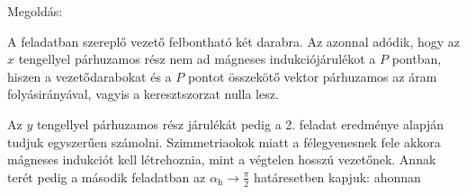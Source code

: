 
\ifdefined\megoldas
  
 Megoldás: 

 A feladatban szereplő vezető felbontható két darabra. Az azonnal adódik, hogy az $x$ tengellyel párhuzamos rész nem ad mágneses indukciójárulékot a $P$ pontban, hiszen a vezetődarabokat és a $P$ pontot összekötő vektor párhuzamos az áram folyásirányával, vagyis a keresztszorzat nulla lesz. 

 Az $y$ tengellyel párhuzamos rész járulékát pedig a 2. feladat eredménye alapján tudjuk egyszerűen számolni. Szimmetriaokok miatt a félegyenesnek fele akkora mágneses indukciót kell létrehoznia, mint a végtelen hosszú vezetőnek. Annak terét pedig a második feladatban az $\alpha_\text{h}\to\frac{\pi}{2}$ határesetben kapjuk:
 ahonnan
 
\fi